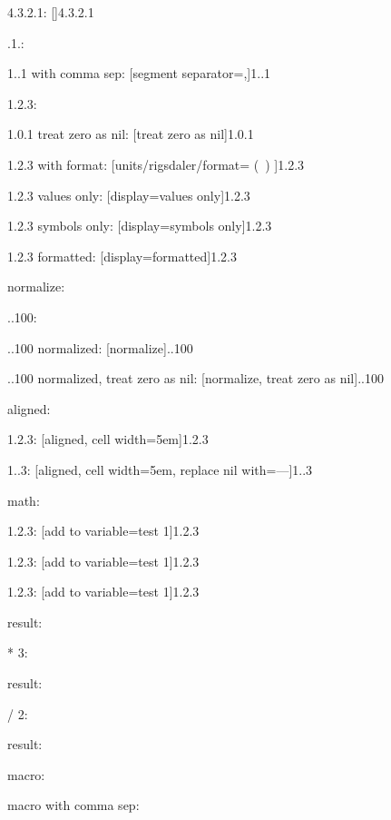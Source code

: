 \documentclass{article}
\begin{document}
4.3.2.1: \hfill {}[]{4.3.2.1}

.1.: \hfill {}

1..1 with comma sep: \hfill {}[segment separator={,}]{1..1}

1.2.3: \hfill {}

1.0.1 treat zero as nil: \hfill {}[treat zero as nil]{1.0.1}

1.2.3 with format: \hfill {}[units/rigsdaler/format={ (\SYMBOL\ \VALUE) }]{1.2.3}

1.2.3 values only: \hfill {}[display=values only]{1.2.3}

1.2.3 symbols only: \hfill {}[display=symbols only]{1.2.3}

1.2.3 formatted: \hfill {}[display=formatted]{1.2.3}

normalize:

..100: \hfill {}

..100 normalized: \hfill {}[normalize]{..100}

..100 normalized, treat zero as nil: \hfill {}[normalize, treat zero as nil]{..100}

aligned:

1.2.3: \hfill {}[aligned, cell width=5em]{1.2.3}

1..3: \hfill {}[aligned, cell width=5em, replace nil with={---}]{1..3}

math:

1.2.3: \hfill {}[add to variable=test 1]{1.2.3}

1.2.3: \hfill {}[add to variable=test 1]{1.2.3}

1.2.3: \hfill {}[add to variable=test 1]{1.2.3}

result: \hfill {}

* 3: \hfill {}

result: \hfill {}

/ 2: \hfill {}

result: \hfill {}

macro: \hfill {}

macro with comma sep: \hfill {}
\end{document}

